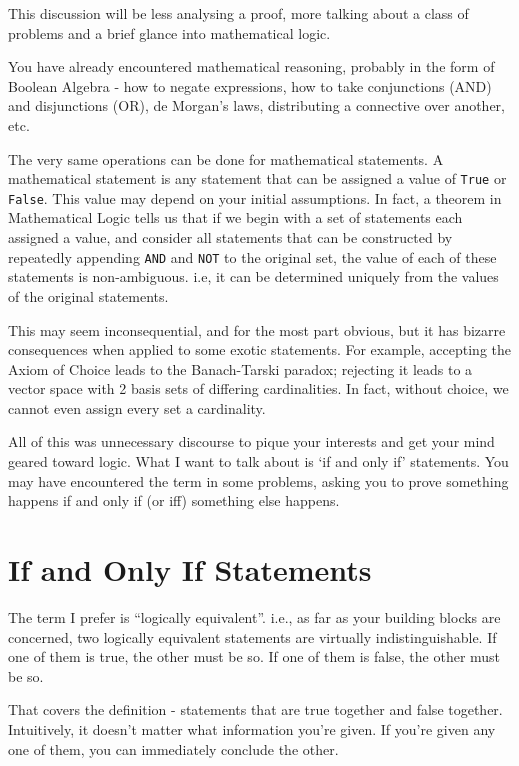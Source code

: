 

This discussion will be less analysing a proof, more talking about a class of problems and a brief glance into mathematical logic.

You have already encountered mathematical reasoning, probably in the form of Boolean Algebra - how to negate expressions, how to take conjunctions (AND) and disjunctions (OR), de Morgan's laws, distributing a connective over another, etc.

The very same operations can be done for mathematical statements. A mathematical statement is any statement that can be assigned a value of \texttt{True} or \texttt{False}. This value may depend on your initial assumptions. In fact, a theorem in Mathematical Logic tells us that if we begin with a set of statements each assigned a value, and consider all statements that can be constructed by repeatedly appending \texttt{AND} and \texttt{NOT} to the original set, the value of each of these statements is non-ambiguous. i.e, it can be determined uniquely from the values of the original statements.

This may seem inconsequential, and for the most part obvious, but it has bizarre consequences when applied to some exotic statements. For example, accepting the Axiom of Choice leads to the Banach-Tarski paradox; rejecting it leads to a vector space with 2 basis sets of differing cardinalities. In fact, without choice, we cannot even assign every set a cardinality.

All of this was unnecessary discourse to pique your interests and get your mind geared toward logic. What I want to talk about is `if and only if' statements. You may have encountered the term in some problems, asking you to prove something happens if and only if (or iff) something else happens.

\section*{If and Only If Statements}
The term I prefer is ``logically equivalent''. i.e., as far as your building blocks are concerned, two logically equivalent statements are virtually indistinguishable. If one of them is true, the other must be so. If one of them is false, the other must be so.

That covers the definition - statements that are true together and false together. Intuitively, it doesn't matter what information you're given. If you're given any one of them, you can immediately conclude the other.


